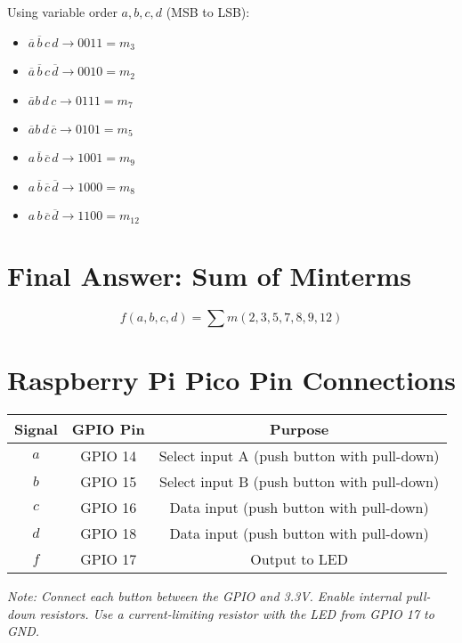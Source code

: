 \documentclass[12pt]{article}
\begin{document}
Using variable order $a, b, c, d$ (MSB to LSB):

\begin{itemize}
    \item $\overline{a}\,\overline{b}\,c\,d \rightarrow 0011 = m_3$
    \item $\overline{a}\,\overline{b}\,c\,\overline{d} \rightarrow 0010 = m_2$
    \item $\overline{a}b\,d\,c \rightarrow 0111 = m_7$
    \item $\overline{a}b\,d\,\overline{c} \rightarrow 0101 = m_5$
    \item $a\,\overline{b}\,\overline{c}\,d \rightarrow 1001 = m_9$
    \item $a\,\overline{b}\,\overline{c}\,\overline{d} \rightarrow 1000 = m_8$
    \item $a\,b\,\overline{c}\,\overline{d} \rightarrow 1100 = m_{12}$
\end{itemize}

\section*{Final Answer: Sum of Minterms}

\[
\boxed{f(a,b,c,d) = \sum m(2, 3, 5, 7, 8, 9, 12)}
\]

\section*{Raspberry Pi Pico Pin Connections}

\begin{tabular}{|c|c|c|}
\hline
\textbf{Signal} & \textbf{GPIO Pin} & \textbf{Purpose} \\
\hline
\(a\) & GPIO 14 & Select input A (push button with pull-down) \\
\(b\) & GPIO 15 & Select input B (push button with pull-down) \\
\(c\) & GPIO 16 & Data input (push button with pull-down) \\
\(d\) & GPIO 18 & Data input (push button with pull-down) \\
\(f\) & GPIO 17 & Output to LED \\
\hline
\end{tabular}

\bigskip

\textit{Note: Connect each button between the GPIO and 3.3V. Enable internal pull-down resistors. Use a current-limiting resistor with the LED from GPIO 17 to GND.}
\end{document}
